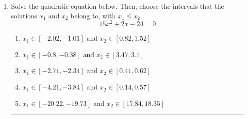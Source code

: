 \documentclass[14pt]{extbook}
\newcommand{\litem}[1]{\item#1\hspace*{-1cm}\rule{\textwidth}{0.4pt}}
\begin{document}
\begin{enumerate}
{\begin{enumerate}[label=\Alph*.]
\end{enumerate} }
\litem{
Solve the quadratic equation below. Then, choose the intervals that the solutions $x_1$ and $x_2$ belong to, with $x_1 \leq x_2$.\[ 15x^{2} +2 x -24 = 0 \]\begin{enumerate}[label=\Alph*.]
\item \( x_1 \in [-2.02, -1.01] \text{ and } x_2 \in [0.82, 1.52] \)
\item \( x_1 \in [-0.8, -0.38] \text{ and } x_2 \in [3.47, 3.7] \)
\item \( x_1 \in [-2.71, -2.34] \text{ and } x_2 \in [0.41, 0.62] \)
\item \( x_1 \in [-4.21, -3.84] \text{ and } x_2 \in [0.14, 0.57] \)
\item \( x_1 \in [-20.22, -19.73] \text{ and } x_2 \in [17.84, 18.35] \)


\end{enumerate}}
\end{enumerate}
\end{document}
